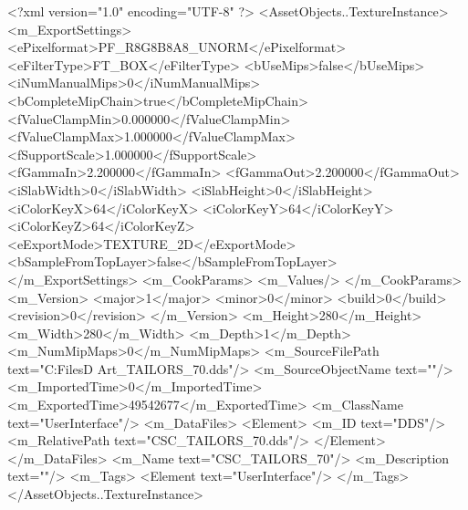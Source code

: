 <?xml version="1.0" encoding="UTF-8" ?>
<AssetObjects..TextureInstance>
	<m_ExportSettings>
		<ePixelformat>PF_R8G8B8A8_UNORM</ePixelformat>
		<eFilterType>FT_BOX</eFilterType>
		<bUseMips>false</bUseMips>
		<iNumManualMips>0</iNumManualMips>
		<bCompleteMipChain>true</bCompleteMipChain>
		<fValueClampMin>0.000000</fValueClampMin>
		<fValueClampMax>1.000000</fValueClampMax>
		<fSupportScale>1.000000</fSupportScale>
		<fGammaIn>2.200000</fGammaIn>
		<fGammaOut>2.200000</fGammaOut>
		<iSlabWidth>0</iSlabWidth>
		<iSlabHeight>0</iSlabHeight>
		<iColorKeyX>64</iColorKeyX>
		<iColorKeyY>64</iColorKeyY>
		<iColorKeyZ>64</iColorKeyZ>
		<eExportMode>TEXTURE_2D</eExportMode>
		<bSampleFromTopLayer>false</bSampleFromTopLayer>
	</m_ExportSettings>
	<m_CookParams>
		<m_Values/>
	</m_CookParams>
	<m_Version>
		<major>1</major>
		<minor>0</minor>
		<build>0</build>
		<revision>0</revision>
	</m_Version>
	<m_Height>280</m_Height>
	<m_Width>280</m_Width>
	<m_Depth>1</m_Depth>
	<m_NumMipMaps>0</m_NumMipMaps>
	<m_SourceFilePath text="C:\Users\Shadow\Desktop\Working Files\2D Art\Quarters\Tailors\CSC_TAILORS_70.dds"/>
	<m_SourceObjectName text=""/>
	<m_ImportedTime>0</m_ImportedTime>
	<m_ExportedTime>49542677</m_ExportedTime>
	<m_ClassName text="UserInterface"/>
	<m_DataFiles>
		<Element>
			<m_ID text="DDS"/>
			<m_RelativePath text="CSC_TAILORS_70.dds"/>
		</Element>
	</m_DataFiles>
	<m_Name text="CSC_TAILORS_70"/>
	<m_Description text=""/>
	<m_Tags>
		<Element text="UserInterface"/>
	</m_Tags>
</AssetObjects..TextureInstance>

